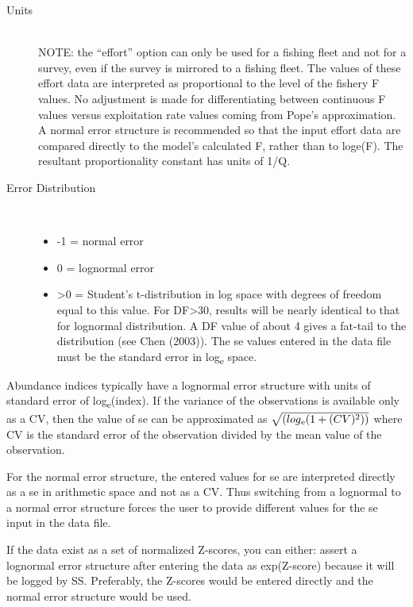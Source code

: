 \begin{description}
	\item[Units]\hfill\\
	NOTE:  the “effort” option can only be used for a fishing fleet and not for a survey, even if the survey is mirrored to a fishing fleet.  The values of these effort data are interpreted as proportional to the level of the fishery F values.  No adjustment is made for differentiating between continuous F values versus exploitation rate values coming from Pope’s approximation.  A normal error structure is recommended so that the input effort data are compared directly to the model’s calculated F, rather than to loge(F).  The resultant proportionality constant has units of 1/Q.
	\item[Error Distribution]\
		\begin{itemize}
			\item -1 = normal error
			\item  0 = lognormal error
			\item >0 = Student's t-distribution in log space with degrees of freedom equal to this value.  For DF>30, results will be nearly identical to that for lognormal distribution.  A DF value of about 4 gives a fat-tail to the distribution (see Chen (2003)).  The se values entered in the data file must be the standard error in log\textsubscript{e} space.
		\end{itemize}
\end{description}

Abundance indices typically have a lognormal error structure with units of standard error of log\textsubscript{e}(index).  If the variance of the observations is available only as a CV, then the value of se can be approximated as $\sqrt{(log\textsubscript{e}(1+(CV)\textsuperscript{2}))}$ where CV is the standard error of the observation divided by the mean value of the observation.

For the normal error structure, the entered values for se are interpreted directly as a se in arithmetic space and not as a CV.  Thus switching from a lognormal to a normal error structure forces the user to provide different values for the se input in the data file.

If the data exist as a set of normalized Z-scores, you can either:  assert a lognormal error structure after entering the data as exp(Z-score) because it will be logged by SS.  Preferably, the Z-scores would be entered directly and the normal error structure would be used.

